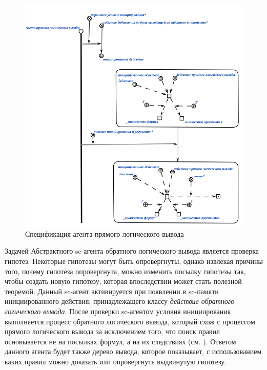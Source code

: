 \begin{figure}[http]
	\includegraphics[scale=0.8]{author/part3/figures/direct_inference_agent.png}
	\caption{Спецификация агента прямого логического вывода}
	\label{fig:direct_inference_agent}
\end{figure}

Задачей Абстрактного sc-агента обратного логического вывода является проверка гипотез. Некоторые гипотезы могут быть опровергнуты, однако извлекая причины того, почему гипотеза опровергнута, можно изменить посылку гипотезы так, чтобы создать новую гипотезу, которая впоследствии может стать полезной теоремой. Данный sc-агент активируется при появлении в sc-памяти инициированного действия, принадлежащего классу \textit{действие обратного логического вывода}. После проверки sc-агентом условия инициирования выполняется процесс обратного логического вывода, который схож с процессом прямого логического вывода за исключением того, что поиск правил основывается не на посылках формул, а на их следствиях (см.  ). Ответом данного агента будет также дерево вывода, которое показывает, с использованием каких правил можно доказать или опровергнуть выдвинутую гипотезу.

